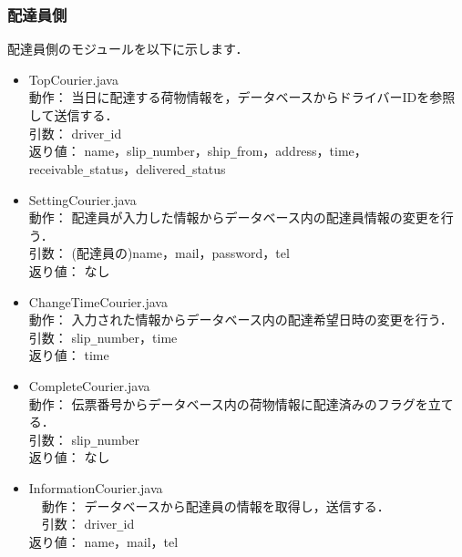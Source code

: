 \documentclass[a4j,titlepage]{jarticle}
\begin{document}
\subsubsection{配達員側}
配達員側のモジュールを以下に示します．
\begin{itemize}
\item TopCourier.java\\
  動作： 当日に配達する荷物情報を，データベースからドライバーIDを参照して送信する．\\
  引数： driver\verb|_|id\\
  返り値： name，slip\verb|_|number，ship\verb|_|from，address，time，receivable\verb|_|status，delivered\verb|_|status
\item SettingCourier.java\\
  動作： 配達員が入力した情報からデータベース内の配達員情報の変更を行う．\\
  引数： (配達員の)name，mail，password，tel\\
  返り値： なし
\item ChangeTimeCourier.java\\
  動作： 入力された情報からデータベース内の配達希望日時の変更を行う．\\
  引数： slip\verb|_|number，time\\
  返り値： time
\item CompleteCourier.java\\
  動作： 伝票番号からデータベース内の荷物情報に配達済みのフラグを立てる．\\
  引数： slip\verb|_|number\\
  返り値： なし
\item  InformationCourier.java\\
　動作： データベースから配達員の情報を取得し，送信する．\\
　引数： driver\verb|_|id\\
返り値： name，mail，tel
\end{itemize}
\end{document}
